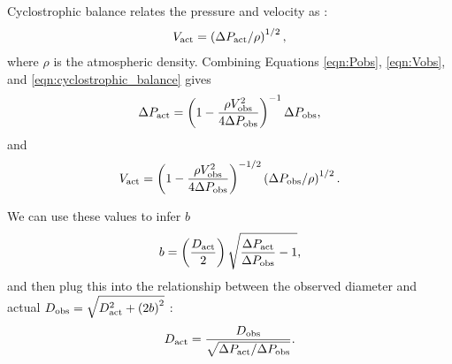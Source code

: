 \documentclass{aastex63}
\begin{document}
Cyclostrophic balance relates the pressure and velocity as \citep{2020Icar..33813523J}:
\begin{equation}
    V_{\rm act} = \left( \Delta P_{\rm act}/\rho \right)^{1/2},\label{eqn:cyclostrophic_balance}
\end{equation}
where $\rho$ is the atmospheric density. Combining Equations \ref{eqn:Pobs}, \ref{eqn:Vobs}, and \ref{eqn:cyclostrophic_balance} gives
\begin{equation}
    \Delta P_{\rm act} = \left( 1 - \frac{\rho V_{\rm obs}^2}{4 \Delta P_{\rm obs}} \right)^{-1} \Delta P_{\rm obs},\label{eqn:solution_for_Pact}
\end{equation}
and
\begin{equation}
    V_{\rm act} = \left( 1 - \frac{\rho V_{\rm obs}^2}{4 \Delta P_{\rm obs}} \right)^{-1/2} \left( \Delta P_{\rm obs}/\rho \right)^{1/2}.\label{eqn:solution_for_Vact}
\end{equation}

We can use these values to infer $b$
\begin{equation}
    b = \left( \frac{D_{\rm act}}{2} \right) \sqrt{\frac{\Delta P_{\rm act}}{\Delta P_{\rm obs}} - 1},
\end{equation}
and then plug this into the relationship between the observed diameter and actual $D_{\rm obs} = \sqrt{D_{\rm act}^2 + \left( 2 b\right)^2 }$ \citep{2020Icar..33813523J}:
\begin{equation}
    D_{\rm act} = \frac{D_{\rm obs}}{\sqrt{\Delta P_{\rm act}/\Delta P_{\rm obs} }}.\label{eqn:actual_diameter}
\end{equation}


\end{document}
